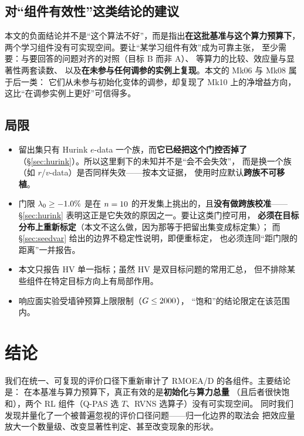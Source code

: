 \documentclass[UTF8, a4paper, 11pt]{ctexart}
\newcommand{\lam}{\lambda_0}
\begin{document}
\subsection{对“组件有效性”这类结论的建议}
本文的负面结论并不是“这个算法不好”，而是指出\textbf{在这批基准与这个算力预算下}，
两个学习组件没有可实现空间。要让“某学习组件有效”成为可靠主张，
至少需要：与要回答的问题对齐的对照（目标 B 而非 A）、
等算力的比较、效应量与显著性两套读数、
以及\textbf{在未参与任何调参的实例上复现}。本文的 Mk06 与 Mk08 属于后一类：
它们从未参与初始化变体的调参，却复现了 Mk10 上的净增益方向，
这比“在调参实例上更好”可信得多。

\subsection{局限}
\begin{itemize}\itemsep2pt
  \item 留出集只有 Hurink $e$-data 一个族，而\textbf{它已经把这个门控否掉了}
        （\S\ref{sec:hurink}）。所以这里剩下的未知并不是“会不会失效”，
        而是换一个族（如 $r$/$v$-data）是否同样失效——按本文证据，
        使用时应默认\textbf{跨族不可移植}。
  \item 门限 $\lam\ge\HKthr\%$ 是在 $n=10$ 的开发集上挑出的，且\textbf{没有做跨族校准}——
        \S\ref{sec:hurink} 表明这正是它失效的原因之一。要让这类门控可用，
        \textbf{必须在目标分布上重新标定}（本文不这么做，因为那等于把留出集变成标定集）；
        而 \S\ref{sec:seedvar} 给出的边界不稳定性说明，即便重标定，
        也必须连同“距门限的距离”一并报告。
  \item 本文只报告 HV 单一指标；虽然 HV 是双目标问题的常用汇总，
        但不排除某些组件在特定目标方向上有局部作用。
  \item 响应面实验受墙钟预算上限限制（$G\le 2000$），
        “饱和”的结论限定在该范围内。
\end{itemize}

\section{结论}\label{sec:concl}

我们在统一、可复现的评价口径下重新审计了 RMOEA/D 的各组件。主要结论是：
在本基准与算力预算下，真正有效的是\textbf{初始化}与\textbf{算力总量}
（且后者很快饱和），两个 RL 组件（Q-PAS 选 $T$、RVNS 选算子）没有可实现空间。
同时我们发现并量化了一个被普遍忽视的评价口径问题——归一化边界的取法会
把效应量放大一个数量级、改变显著性判定、甚至改变现象的形状。
\end{document}

